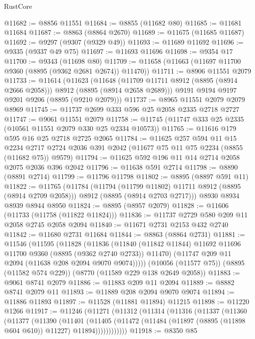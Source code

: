 \begin{lexlean}{RustCore}
\begin{coremodule}
@11682 := @8856 @11551
@11684 := @8855 (@11682 @80)
@11685 := @11681 @11684
@11687 := @8863 (@8864 @2670)
@11689 := @11675 (@11685 @11687)
@11692 := @9297 (@9307 (@9329 @49))
@11693 := @11689 @11692
@11696 := @9335 (@9337 @49 @75)
@11697 := @11693 @11696
@11698 := @9354 @17
@11700 := @9343 (@11698 @80)
@11709 := @11658 (@11663 (@11697 @11700 @9360 (@8895 (@9362 @2681 @2674)) @11470))
@11711 := @8906 @11551 @2079
@11733 := @11614
    (@11623
      (@11648 (@11709 @11711 @8912 (@8895 (@8914 @2666 @2058))) @8912 (@8895 (@8914 @2658 @2689)))
      @9191
      @9194
      @9197
      @9201
      @9206
      (@8895 (@9210 @2079)))
@11737 := @8965 @11551 @2079 @2079 @8969
@11745 := @11737 @2699 @333 @596 @25 @2058 @2335 @2718 @2727
@11747 := @9061 @11551 @2079
@11758 := @11745 (@11747 @333 @25 @2335 (@10561 @11551 @2079 @330 @25 @2334 @10573))
@11765 := @11616 @179 @595 @16 @25 @2718 @2725 @2065
@11784 := @11625
    @257
    @594
    @11
    @15
    @2234
    @2717
    @2724
    @2036
    @391
    @2042
    (@11677 @75 @11 @75 @2234 (@8855 (@11682 @75)) @9579)
@11794 := @11625 @592 @196 @11 @14 @2714 @2058 @2075 @2036 @396 @2042
@11796 := @11638 @591 @2714
@11798 := @8890 (@8891 @2714)
@11799 := @11796 @11798
@11802 := @8895 (@8897 @591 @11)
@11822 := @11765
    (@11784
      (@11794 (@11799 @11802) @11711 @8912 (@8895 (@8914 @2709 @2058)))
      @8912
      (@8895 (@8914 @2703 @2717)))
    @8930
    @8934
    @8939
    @8944
    @8950
@11824 := @8895 (@8957 @2079)
@11828 := @11606 (@11733 (@11758 (@11822 @11824)))
@11836 := @11737 @2729 @580 @209 @11 @2058 @2745 @2058 @2094
@11840 := @11671 @2731 @2153 @432 @2740
@11842 := @11680 @2731 @11684
@11844 := @8863 (@8864 @2731)
@11881 := @11546
    (@11595
      (@11828
        (@11836
          (@11840 (@11842 @11844) @11692 @11696 @11700 @9360 (@8895 (@9362 @2740 @2733)) @11470)
          (@11747 @209 @11 @2094 (@11638 @208 @2094 @9070 @9074)))))
    (@10056 (@11577 @75))
    (@8895 (@11582 @574 @229))
    (@8770 (@11589 @229 @138 @2649 @2058))
@11883 := @9061 @8741 @2079
@11886 := @11883 @209 @11 @2094
@11889 := @8882 @8741 @2079 @11
@11893 := @11889 @208 @2094 @9070 @9074
@11894 := @11886 @11893
@11897 := @11528 (@11881 @11894) @11215
@11898 := @11220 @1266
@11917 := @11246
    (@11271
      (@11312
        (@11314
          (@11316
            (@11337
              (@11360
                (@11377
                  (@11390
                    (@11401
                      (@11405
                        (@11472
                          (@11484 (@11897 (@8895 (@11898 @604 @610)) @11227) @11894))))))))))))
@11918 := @8350 @85

\end{coremodule}
\end{lexlean}
